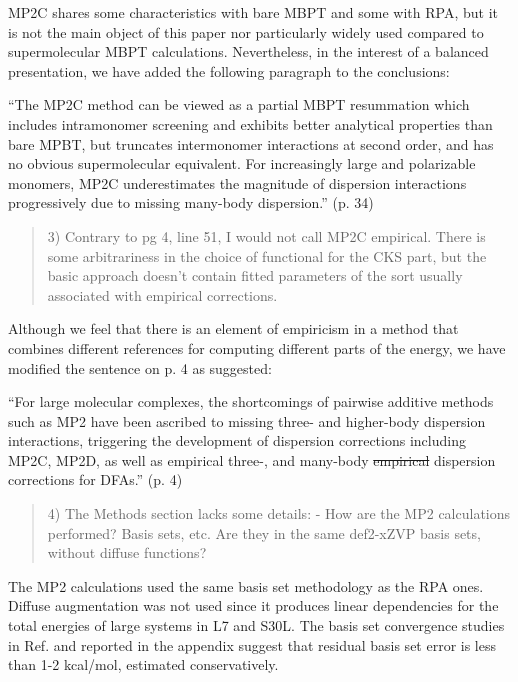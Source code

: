 \documentclass[journal=jctcce,manuscript=article]{achemso}
\newcommand*{\rev}[1]{{\color{blue} #1}}
\newenvironment{reviewer}%
{\begin{quote}%
  \begin{changebar}\cbcolor{gray}\color{black}}%
  {\end{changebar}%
\end{quote}}
\begin{document}
MP2C shares some characteristics with bare MBPT and some with RPA, but
it is not the main object of this paper nor particularly widely used
compared to supermolecular MBPT calculations. Nevertheless, in the
interest of a balanced presentation, we have
added the following paragraph to the conclusions:

\rev{``The MP2C method can be viewed as a partial MBPT resummation which
  includes intramonomer screening and exhibits better analytical properties
  than bare MPBT, but truncates intermonomer interactions at second order,
  and has no obvious supermolecular equivalent. For increasingly large
  and polarizable monomers, MP2C underestimates the magnitude of
  dispersion interactions progressively due to missing many-body
  dispersion.''} (p. 34)


\begin{reviewer}
3) Contrary to pg 4, line 51, I would not call MP2C empirical.  There is some
arbitrariness in the choice of functional for the CKS part, but the basic approach
doesn't contain fitted parameters of the sort usually associated with empirical
corrections.
\end{reviewer}

Although we feel that there is an element of empiricism in a method that
combines different references for computing different parts of the
energy, we have modified the sentence on p. 4 as suggested:

``For large molecular complexes, the shortcomings of pairwise additive methods
  such as MP2 have been ascribed to missing three- and higher-body dispersion
  interactions,\cite{Grimme12ChemEurJ18p9955} triggering the development of
  \rev{dispersion} corrections
  including MP2C,\cite{doi:10.1063/1.2905808,Pitonak10JChemTheoryComput6p168,
    doi:10.1063/1.4809981}
  \rev{MP2D,\cite{doi:10.1021/acs.jctc.8b00548,C9SC05689K}} as
  well as empirical three-\cite{Grimme12ChemEurJ18p9955,
    Caldeweyher17JChemPhys147p034112},
  and many-body\cite{Tkatchenko12PhysRevLett108p236402} \rev{\sout{empirical}}
  dispersion corrections for DFAs.'' (p. 4)

\begin{reviewer}
4) The Methods section lacks some details:
- How are the MP2 calculations performed?  Basis sets, etc. Are they in the
same def2-xZVP basis sets, without diffuse functions?
\end{reviewer}

The MP2 calculations used the same basis set methodology as the RPA
ones. Diffuse augmentation was not used since it produces linear dependencies
for the total energies of large systems in L7 and S30L. The basis set
convergence studies in Ref. 
and reported in the appendix suggest that residual basis set
error is less than 1-2 kcal/mol, estimated conservatively.
\end{document}
